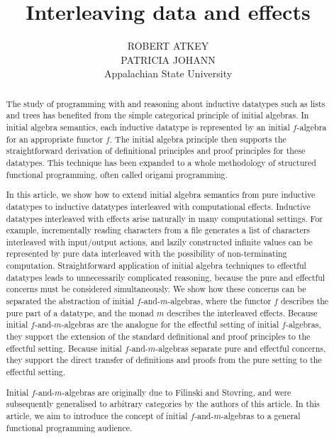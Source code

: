 \documentclass{jfp1}
\title{Interleaving data and effects}
\author[R. Atkey, P. Johann]
       {ROBERT ATKEY \\
         \vspace{0.3em}
         PATRICIA JOHANN \\
         Appalachian State University \\
         \email{bob.atkey@gmail.com, johannp@appstate.edu}}
\begin{document}
\label{firstpage}

\maketitle

\begin{abstract}
  The study of programming with and reasoning about inductive
  datatypes such as lists and trees has benefited from the simple
  categorical principle of initial algebras. In initial algebra
  semantics, each inductive datatype is represented by an initial
  $f$-algebra for an appropriate functor $f$. The initial algebra
  principle then supports the straightforward derivation of
  definitional principles and proof principles for these datatypes.
  This technique has been expanded to a whole methodology of
  structured functional programming, often called origami programming.

  In this article, we show how to extend initial algebra semantics
  from pure inductive datatypes to inductive datatypes interleaved
  with computational effects. Inductive datatypes interleaved with
  effects arise naturally in many computational settings. For example,
  incrementally reading characters from a file generates a list of
  characters interleaved with input/output actions, and lazily
  constructed infinite values can be represented by pure data
  interleaved with the possibility of non-terminating
  computation. Straightforward application of initial algebra
  techniques to effectful datatypes leads to unnecessarily complicated
  reasoning, because the pure and effectful concerns must be
  considered simultaneously. We show how these concerns can be
  separated the abstraction of initial $f$-and-$m$-algebras, where the
  functor $f$ describes the pure part of a datatype, and the monad $m$
  describes the interleaved effects. Because initial
  $f$-and-$m$-algebras are the analogue for the effectful setting of
  initial $f$-algebras, they support the extension of the standard
  definitional and proof principles to the effectful setting. Because
  initial $f$-and-$m$-algebras separate pure and effectful concerns,
  they support the direct transfer of definitions and proofs from the
  pure setting to the effectful setting.

  Initial $f$-and-$m$-algebras are originally due to Filinski and
  St\o{}vring, and were subsequently generalised to arbitrary
  categories by the authors of this article. In this article, we aim
  to introduce the concept of initial $f$-and-$m$-algebras to a
  general functional programming audience.
\end{abstract}
\end{document}
